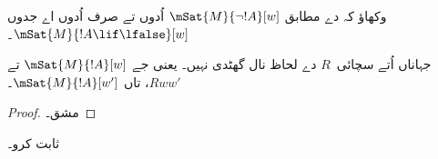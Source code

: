 \documentclass[../../../include/open-logic-section]{subfiles}
\begin{document}
\begin{prob}
  وکھاؤ کہ  دے مطابق
  $\mSat{M}{\lnot !A}[w]$ اُدوں تے صرف اُدوں اے جدوں $\mSat{M}{!A \lif \lfalse}[w]$۔
\end{prob}

\begin{prop}
  جہاناں اُتے سچائی~$R$ دے لحاظ نال گھٹدی نہیں۔ یعنی جے
  $\mSat{M}{!A}[w]$ تے $Rww'$، تاں $\mSat{M}{!A}[w']$۔
\end{prop}

\begin{proof}
  مشق۔
\end{proof}

\begin{prob}
   ثابت کرو۔
\end{prob}
\end{document}
